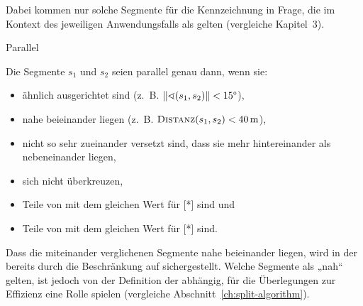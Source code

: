 \documentclass[../main/thesis.tex]{subfiles}
\begin{document}

Dabei kommen nur solche Segmente für die Kennzeichnung in Frage, die im Kontext des jeweiligen Anwendungsfalls als  gelten (vergleiche Kapitel~3).

\begin{algorithmhere}{Parallel}
\label{alg:Parallel}
\begin{algorithmic}
	\State Die Segmente $s_1$ und $s_2$ seien parallel genau dann, wenn sie:
	\begin{itemize}[nosep,leftmargin=3.5em]
		\item ähnlich ausgerichtet sind (z.~B. $|\!\;\!|\sphericalangle (s_1, s_2)|\!\;\!| < 15\degree$),
		\item nahe beieinander liegen (z.~B. $\textproc{Distanz}(s_1, s_2) < \unit[40]{m}$),
		\item nicht so sehr zueinander versetzt sind, dass sie mehr hintereinander als nebeneinander liegen,  %
		\item sich nicht überkreuzen,  %
		\item Teile von  mit dem gleichen Wert für [*] sind und
		\item Teile von  mit dem gleichen Wert für [*] sind.
	\end{itemize}
\EndFunction
\end{algorithmic}
\end{algorithmhere}

Dass die miteinander verglichenen Segmente nahe beieinander liegen, wird in der  bereits durch die Beschränkung auf  sichergestellt.
Welche Segmente als „nah“ gelten, ist jedoch von der Definition der  abhängig, für die Überlegungen zur Effizienz eine Rolle spielen (vergleiche Abschnitt~\ref{ch:split-algorithm}).
\end{document}

